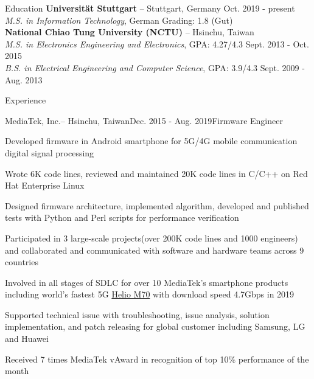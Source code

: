 \documentclass{resume} %
\begin{document}

\begin{rSection}{Education}
{\bf Universität Stuttgart }{--  Stuttgart, Germany}  \hfill {Oct. 2019 - present}\\
{\em M.S. in Information Technology}{, German Grading: 1.8 (Gut) \\ 
{\bf National Chiao Tung University (NCTU) }{--  Hsinchu, Taiwan} \\
\em M.S. in Electronics Engineering and Electronics}{, GPA: 4.27/4.3} \hfill {Sept. 2013 - Oct. 2015}\\ 
{\em B.S. in Electrical Engineering and Computer Science}{, GPA: 3.9/4.3} \hfill { Sept. 2009 - Aug. 2013}
\end{rSection}

\begin{rSection}{Experience}

\begin{rSubsection}{MediaTek, Inc.}{-- Hsinchu, Taiwan}{Dec. 2015 - Aug. 2019}{Firmware Engineer}

\item Developed firmware in Android smartphone for 5G/4G mobile communication digital signal processing
\item Wrote 6K code lines, reviewed and maintained 20K code lines in C/C++ on Red Hat Enterprise Linux
\item Designed firmware architecture, implemented algorithm, developed and published tests with Python and Perl scripts for performance verification 
\item Participated in 3 large-scale projects(over 200K code lines and 1000 engineers) and collaborated and communicated with software and hardware teams across 9 countries
\item Involved in all stages of SDLC for over 10 MediaTek’s smartphone products including world's fastest 5G  \href{https://newsletter.mediatek.com/hubfs/whatis5gnew/infographic.pdf
}{Helio M70} with download speed 4.7Gbps in 2019
\item Supported technical issue with troubleshooting, issue analysis, solution implementation, and patch releasing for global customer including Samsung, LG and Huawei
\item Received 7 times MediaTek vAward in recognition of top 10\% performance of the month

\end{rSubsection}

\end{rSection}
\end{document}
